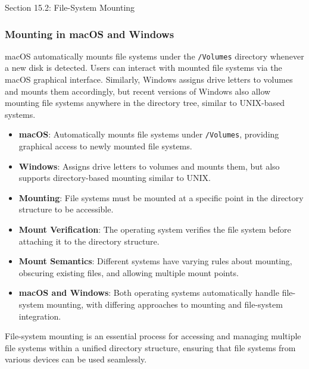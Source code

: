 \begin{notes}{Section 15.2: File-System Mounting}
    \subsubsection*{Mounting in macOS and Windows}
    
    macOS automatically mounts file systems under the \texttt{/Volumes} directory whenever a new disk is detected. Users can interact with mounted file systems via the macOS graphical interface. Similarly, 
    Windows assigns drive letters to volumes and mounts them accordingly, but recent versions of Windows also allow mounting file systems anywhere in the directory tree, similar to UNIX-based systems.
    
    \begin{highlight}
    
        \begin{itemize}
            \item \textbf{macOS}: Automatically mounts file systems under \texttt{/Volumes}, providing graphical access to newly mounted file systems.
            \item \textbf{Windows}: Assigns drive letters to volumes and mounts them, but also supports directory-based mounting similar to UNIX.
        \end{itemize}
    
    \end{highlight}
    
    \begin{highlight}
    
        \begin{itemize}
            \item \textbf{Mounting}: File systems must be mounted at a specific point in the directory structure to be accessible.
            \item \textbf{Mount Verification}: The operating system verifies the file system before attaching it to the directory structure.
            \item \textbf{Mount Semantics}: Different systems have varying rules about mounting, obscuring existing files, and allowing multiple mount points.
            \item \textbf{macOS and Windows}: Both operating systems automatically handle file-system mounting, with differing approaches to mounting and file-system integration.
        \end{itemize}
    
    File-system mounting is an essential process for accessing and managing multiple file systems within a unified directory structure, ensuring that file systems from various devices can be used seamlessly.
    
    \end{highlight}
\end{notes}

